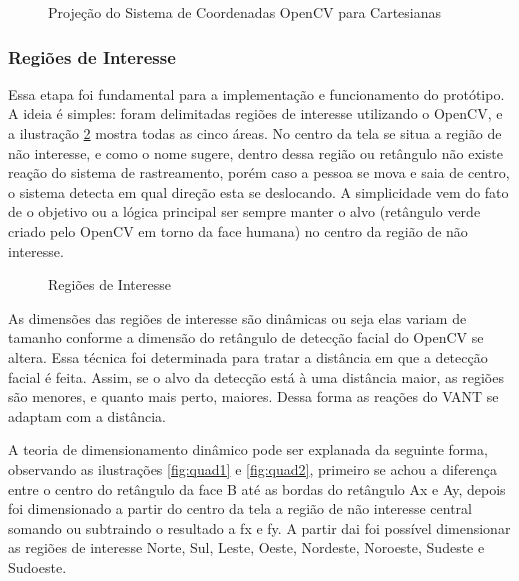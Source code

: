 \begin{figure}[H]
	\centering
	\caption{Projeção do Sistema de Coordenadas OpenCV para Cartesianas}
	
	\label{fig:conv}
\end{figure}

\subsubsection{Regiões de Interesse}

Essa etapa foi fundamental para a implementação e funcionamento do protótipo. A ideia é simples: foram delimitadas regiões de interesse utilizando o OpenCV, e a ilustração \ref{fig:regint} mostra todas as cinco áreas. No centro da tela se situa a região de não interesse, e como o nome sugere, dentro dessa região ou retângulo não existe reação do sistema de rastreamento, porém caso a pessoa se mova e saia de centro, o sistema detecta em qual direção esta se deslocando. A simplicidade vem do fato de o objetivo ou a lógica principal ser sempre manter o alvo (retângulo verde criado pelo OpenCV em torno da face humana) no centro da região de não interesse.  

\begin{figure}[H]
	\centering
	\caption{Regiões de Interesse}
	
	\label{fig:regint}
\end{figure}
As dimensões das regiões de interesse são dinâmicas ou seja elas variam de tamanho conforme a dimensão do retângulo de detecção facial do OpenCV se altera. Essa técnica foi determinada para tratar a distância em que a detecção facial é feita. Assim, se o alvo da detecção está à uma distância maior, as regiões são menores, e quanto mais perto, maiores. Dessa forma as reações do VANT se adaptam com a distância.

A teoria de dimensionamento dinâmico pode ser explanada da seguinte forma, observando as ilustrações \ref{fig:quad1} e \ref{fig:quad2}, primeiro se achou a diferença entre o centro do retângulo da face B até as bordas do retângulo Ax e Ay, depois foi dimensionado a partir do centro da tela a região de não interesse central somando ou subtraindo o resultado a fx e fy. A partir dai foi possível dimensionar as regiões de interesse Norte, Sul, Leste, Oeste, Nordeste, Noroeste, Sudeste e Sudoeste.

